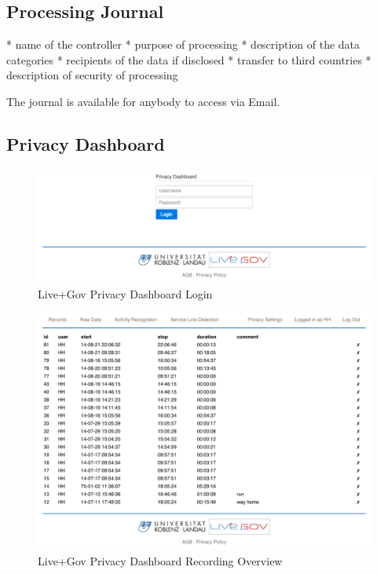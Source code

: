 \subsection{Processing Journal}
* name of the controller
* purpose of processing
* description of the data categories
* recipients of the data if disclosed
* transfer to third countries
* description of security of processing

The journal is available for anybody to access via Email.

\subsection{Privacy Dashboard}


\begin{figure}
\includegraphics[width=\textwidth]{screenshots/login.png}
\caption{Live+Gov Privacy Dashboard Login}
\end{figure}

\begin{figure}
\includegraphics[width=\textwidth]{screenshots/recordings.png}
\caption{Live+Gov Privacy Dashboard Recording Overview}
\end{figure}

